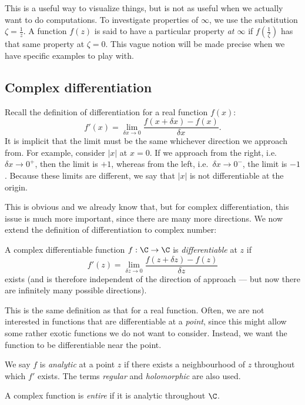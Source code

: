 \documentclass[a4paper]{article}
\begin{document}
This is a useful way to visualize things, but is not as useful when we actually want to do computations. To investigate properties of $\infty$, we use the substitution $\zeta = \frac{1}{z}$. A function $f(z)$ is said to have a particular property \emph{at $\infty$} if $f(\frac{1}{\zeta})$ has that same property at $\zeta = 0$. This vague notion will be made precise when we have specific examples to play with.

\subsection{Complex differentiation}
Recall the definition of differentiation for a real function $f(x)$:
\[
  f'(x) = \lim_{\delta x \to 0} \frac{f(x + \delta x) - f(x)}{\delta x}.
\]
It is implicit that the limit must be the same whichever direction we approach from. For example, consider $|x|$ at $x = 0$. If we approach from the right, i.e.\ $\delta x \to 0^+$, then the limit is $+1$, whereas from the left, i.e.\ $\delta x \to 0^-$, the limit is $-1$. Because these limits are different, we say that $|x|$ is not differentiable at the origin.

This is obvious and we already know that, but for complex differentiation, this issue is much more important, since there are many more directions. We now extend the definition of differentiation to complex number:
\begin{defi}
  A complex differentiable function $f: \C \to \C$ is \emph{differentiable} at $z$ if
  \[
    f'(z) = \lim_{\delta z \to 0} \frac{f(z + \delta z) - f(z)}{\delta z}
  \]
  exists (and is therefore independent of the direction of approach --- but now there are infinitely many possible directions).
\end{defi}
This is the same definition as that for a real function. Often, we are not interested in functions that are differentiable at a \emph{point}, since this might allow some rather exotic functions we do not want to consider. Instead, we want the function to be differentiable near the point.

\begin{defi}
  We say $f$ is \emph{analytic} at a point $z$ if there exists a neighbourhood of $z$ throughout which $f'$ exists. The terms \emph{regular} and \emph{holomorphic} are also used.
\end{defi}

\begin{defi}
  A complex function is \emph{entire} if it is analytic throughout $\C$.
\end{defi}
\end{document}
